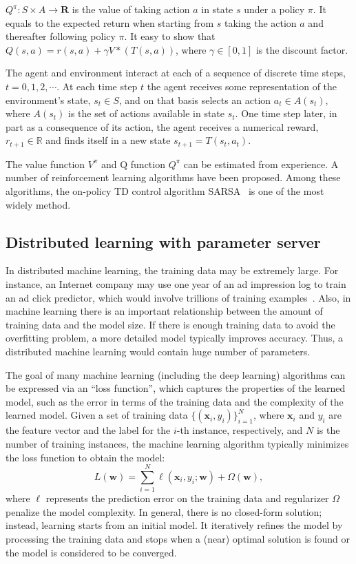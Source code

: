 \documentclass[sigconf]{acmart}
\begin{document}
$Q^\pi:S\times A\rightarrow \mathbf{R}$ is the value of taking action $a$ in state $s$ under a policy $\pi$. It equals to the expected return when starting from $s$ taking the action $a$ and thereafter following policy $\pi$. It easy to show that $Q(s, a)=r(s, a) + \gamma V*(T(s, a))$, where $\gamma\in[0, 1]$ is the discount factor.


The agent and environment interact at each of a sequence of discrete time steps, $t=0, 1, 2, \cdots$. At each time step $t$ the agent receives some representation of the environment's state, $s_t\in S$, and on that basis selects an action $a_t\in A(s_t)$, where $A(s_t)$ is the set of actions available in state $s_t$. One time step later, in part as a consequence of its action, the agent receives a numerical reward, $r_{t+1}\in \mathds{R}$ and finds itself in a new state $s_{t+1} = T(s_t, a_t)$.

The value function $V^\pi$ and Q function $Q^\pi$ can be estimated from experience. A number of reinforcement learning algorithms have been proposed. Among these algorithms, the on-policy TD control algorithm SARSA~\cite{sutton1998reinforcement} is one of the most widely method.

\subsection{Distributed learning with parameter server}
In distributed machine learning, the training data may be extremely large. For instance, an Internet company may use one year of an ad impression log to train an ad click predictor, which would involve trillions of training examples~\cite{li2014scaling}. Also, in machine learning there is an important relationship between the amount of training data and the model size. If there is enough training data to avoid the overfitting problem, a more detailed model typically improves accuracy. Thus, a distributed machine learning would contain huge number of parameters.

The goal of many machine learning (including the deep learning) algorithms can be expressed via an ``loss function'', which captures the properties of the learned model, such as the error in terms of the training data and the complexity of the learned model. Given a set of training data $\{(\mathbf{x}_i, y_i)\}_{i=1}^N$, where $\mathbf{x}_i$ and $y_i$ are the feature vector and the label for the $i$-th instance, respectively, and $N$ is the number of training instances, the machine learning algorithm typically minimizes the loss function to obtain the model:
\[
	L(\mathbf{w})=\sum_{i=1}^N \ell(\mathbf{x}_i, y_i; \mathbf{w}) + \Omega(\mathbf{w}),
\]
where $\ell$ represents the prediction error on the training data and regularizer $\Omega$ penalize the model complexity. In general, there is no closed-form solution; instead, learning starts from an initial model. It iteratively refines the model by processing the training data and stops when a (near) optimal solution is found or the model is considered to be converged.
\end{document}
